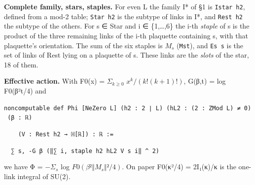 \documentclass[11pt,a4paper]{article}
\theoremstyle{named}
\begin{document}
\textbf{Complete family, stars, staples.} For even L the family I* of §1 is \texttt{Istar\ \allowbreak{}h2}, defined from a mod-2 table; \texttt{Star\ \allowbreak{}h2} is the subtype of links in I*, and \texttt{Rest\ \allowbreak{}h2} the subtype of the others. For s ∈ Star and i ∈ \{1,…,6\} the i-th \textit{staple} of s is the product of the three remaining links of the i-th plaquette containing s, with that plaquette's orientation. The sum of the six staples is $M_s$ (\texttt{Mst}), and \texttt{Es\ \allowbreak{}s} is the set of links of Rest lying on a plaquette of s. These links are the \textit{slots} of the star, 18 of them.

\textbf{Effective action.} With F0(x) = $Σ_{k≥0}$ $x^k/(k!(k+1)!)$, G(β,t) = log F0(β²t/4) and

\begin{leancode}
\item \texttt{noncomputable\ \allowbreak{}def\ \allowbreak{}Phi\ \allowbreak{}[NeZero\ \allowbreak{}L]\ \allowbreak{}(h2\ \allowbreak{}:\ \allowbreak{}2\ \allowbreak{}∣\ \allowbreak{}L)\ \allowbreak{}(hL2\ \allowbreak{}:\ \allowbreak{}(2\ \allowbreak{}:\ \allowbreak{}ZMod\ \allowbreak{}L)\ \allowbreak{}≠\ \allowbreak{}0)\ \allowbreak{}(β\ \allowbreak{}:\ \allowbreak{}ℝ)}
\item \texttt{\ \allowbreak{}\ \allowbreak{}\ \allowbreak{}\ \allowbreak{}(V\ \allowbreak{}:\ \allowbreak{}Rest\ \allowbreak{}h2\ \allowbreak{}→\ \allowbreak{}ℍ[ℝ])\ \allowbreak{}:\ \allowbreak{}ℝ\ \allowbreak{}:=}
\item \texttt{\ \allowbreak{}\ \allowbreak{}∑\ \allowbreak{}s,\ \allowbreak{}-G\ \allowbreak{}β\ \allowbreak{}(‖∑\ \allowbreak{}i,\ \allowbreak{}staple\ \allowbreak{}h2\ \allowbreak{}hL2\ \allowbreak{}V\ \allowbreak{}s\ \allowbreak{}i‖\ \allowbreak{}\textasciicircum{}\ \allowbreak{}2)}
\end{leancode}
we have Φ = $−Σ_s$ log $F0(β²‖M_s‖²/4)$. On paper F0(κ²/4) = 2I₁(κ)/κ is the one-link integral of SU(2).
\end{document}

